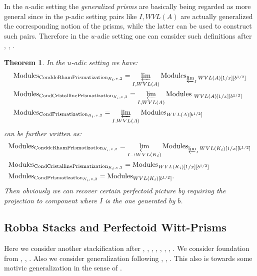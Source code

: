 \documentclass[12pt]{article}
\newtheorem{theorem}{Theorem}
\theoremstyle{definition}
\begin{document}
\indent In the $u$-adic setting the \textit{generalized prisms} are basically being regarded as more general since in the $p$-adic setting pairs like $I,WVL(A)$ are actually generalized the corresponding notion of the prisms, while the latter can be used to construct such pairs. Therefore in the $u$-adic setting one can consider such definitions after \cite{1BS}, \cite{1BL}, \cite{1D}. 

\begin{theorem}
In the $u$-adic setting we have:
\begin{align}
&\mathrm{Modules}_{\mathrm{ConddeRhamPrismatization}_{K_i,v,2}}=\varprojlim_{{I,WVL(A)}} \mathrm{Modules}_{\varprojlim_{I}WVL(A)[1/x][b^{1/2}]}\\
&\mathrm{Modules}_{\mathrm{CondCristallinePrismatization}_{K_i,v,2}}=\varprojlim_{{I,WVL(A)}} \mathrm{Modules}_{\ WVL(A)[1/x][b^{1/2}]}\\
&\mathrm{Modules}_{\mathrm{CondPrismatization}_{K_i,v,2}}=\varprojlim_{{I,WVL(A)}} \mathrm{Modules}_{WVL(A)[b^{1/2}]}
\end{align}
can be further written as:
\begin{align}
&\mathrm{Modules}_{\mathrm{ConddeRhamPrismatization}_{K_i,v,2}}=\varprojlim_{{I\rightarrow WVL(K_i)}} \mathrm{Modules}_{\varprojlim_{I}WVL(K_i)[1/x][b^{1/2}]}\\
&\mathrm{Modules}_{\mathrm{CondCristallinePrismatization}_{K_i,v,2}}=\mathrm{Modules}_{ WVL(K_i)[1/x][b^{1/2}]}\\
&\mathrm{Modules}_{\mathrm{CondPrismatization}_{K_i,v,2}}=\mathrm{Modules}_{WVL(K_i)[b^{1/2}]}.
\end{align}
Then obviously we can recover certain perfectoid picture by requiring the projection to component where $I$ is the one generated by $b$.
\end{theorem}



\subsection{Robba Stacks and Perfectoid Witt-Prisms}

Here we consider another stackification after \cite{1KL}, \cite{1KL1}, \cite{1S1}, \cite{1S2}, \cite{1S3}, \cite{1F1}, \cite{1F2}, \cite{1T1}. We consider foundation from \cite{1CSA}, \cite{1CSB}, \cite{1CS}. Also we consider generalization following  \cite{1BS1}, \cite{1BL1}, \cite{1BL2}. This also is towards some motivic generalization in the sense of \cite{1G}. 
\end{document}

